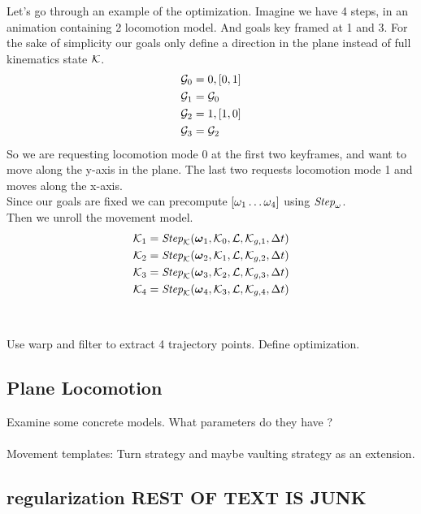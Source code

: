 Let's go through an example of the optimization. Imagine we have 4 steps, in an animation containing 2 locomotion model. And goals key framed at 1 and 3. For the sake of simplicity our goals only define a direction in the plane instead of full kinematics state $\mathcal{K}$.
\begin{subequations}
\begin{align}
    \mathcal{G}_0&={0,[0,1]}\\
    \mathcal{G}_1&=\mathcal{G}_0\\
    \mathcal{G}_2&={1,[1,0]}\\
    \mathcal{G}_3&=\mathcal{G}_2
\end{align}
\end{subequations}
So we are requesting locomotion mode 0 at the first two keyframes, and want to move along the y-axis in the plane. The last two requests locomotion mode 1 and moves along the x-axis.
\\
Since our goals are fixed we can precompute $[\omega_1 \ldots \omega_4]$ using $\textit{Step}_{\omega}$.
\\
Then we unroll the movement model.
\begin{subequations}
\begin{align}
    \mathcal{K}_1 &=\textit{Step}_{\mathcal{K}}(\boldsymbol{\omega }_1, \mathcal{K}_0, \mathcal{L}, \mathcal{K}_{g,1}, \Delta{t} )\\
    \mathcal{K}_2 &=\textit{Step}_{\mathcal{K}}(\boldsymbol{\omega }_2, \mathcal{K}_1, \mathcal{L}, \mathcal{K}_{g,2}, \Delta{t} )\\
    \mathcal{K}_3 &=\textit{Step}_{\mathcal{K}}(\boldsymbol{\omega }_3, \mathcal{K}_2, \mathcal{L}, \mathcal{K}_{g,3}, \Delta{t} )\\
    \mathcal{K}_4 &=\textit{Step}_{\mathcal{K}}(\boldsymbol{\omega }_4, \mathcal{K}_3, \mathcal{L}, \mathcal{K}_{g,4}, \Delta{t} )\\
\end{align}
\end{subequations}
\\\\
Use warp and filter to extract 4 trajectory points. Define optimization.

\subsection{Plane Locomotion}
Examine some concrete models. What parameters do they have ? 
\\\\
 Movement templates: Turn strategy and maybe vaulting strategy as an extension.

\subsection{regularization REST OF TEXT IS JUNK}

